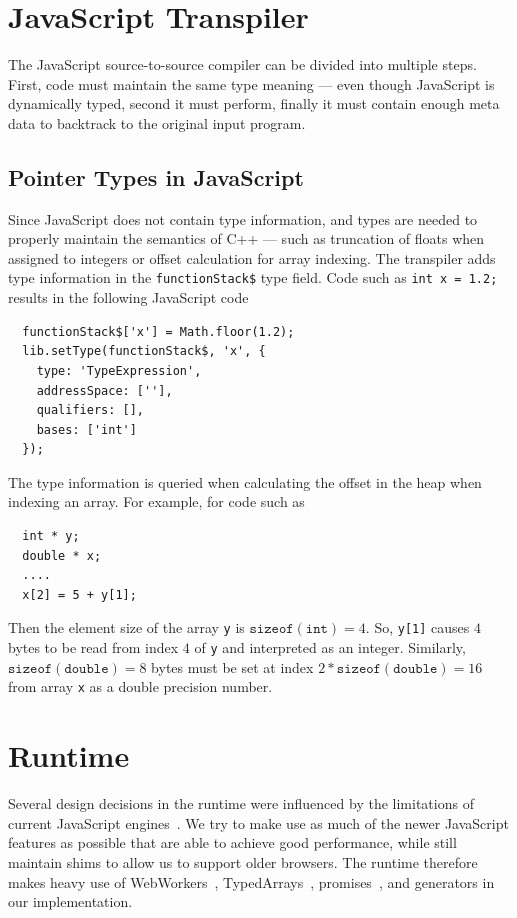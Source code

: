 \documentclass[nocopyrightspace]{sigchi}
\begin{document}
\section{JavaScript Transpiler}

The JavaScript source-to-source compiler can be divided into multiple steps.
First, code must maintain the same type meaning --- even though JavaScript 
is dynamically typed, second it must perform, finally it must contain
enough meta data to backtrack to the original input program.

\subsection{Pointer Types in JavaScript}

Since JavaScript does not contain type information, and types are needed to
properly maintain the semantics of C++ --- such as truncation of floats when
assigned to integers or offset calculation for array indexing. The transpiler
adds type information in the {\tt functionStack\$} type field. Code such as
{\tt int x = 1.2;} results in the following JavaScript code

\begin{verbatim}
  functionStack$['x'] = Math.floor(1.2);
  lib.setType(functionStack$, 'x', {
    type: 'TypeExpression',
    addressSpace: [''],
    qualifiers: [],
    bases: ['int']
  });
\end{verbatim}

The type information is queried when calculating the offset in the heap when
indexing an array. For example, for code such as

\begin{verbatim}
  int * y;
  double * x;
  ....
  x[2] = 5 + y[1];
\end{verbatim}

Then the element size of the array {\tt y} is $\mathtt{sizeof(int)} = 4$.
So, {\tt y[1]} causes $4$ bytes to be read from index $4$ of {\tt y} and
interpreted as an integer. Similarly, $\mathtt{sizeof(double)} = 8$ bytes
must be set at index $2 * \mathtt{sizeof(double)} = 16$ from array {\tt x}
as a double precision number.


\section{Runtime}

Several design decisions in the runtime were influenced by the limitations
of current JavaScript engines~\cite{vilk2014doppio,vouillon2013bytecode,zakai2011emscripten}.
We try to make use as much of the newer JavaScript features as possible that are
able to achieve good performance, while still maintain shims to allow us
to support older browsers. The runtime therefore makes heavy use of WebWorkers~\cite{green2012web}, 
TypedArrays~\cite{matsakistyped, grimmer2014efficient}, promises~\cite{kambona2013evaluation,bonetta2013tigerquoll},
and generators in our implementation. 
\end{document}
